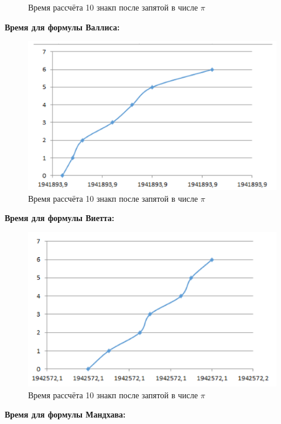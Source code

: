 \documentclass[a4paper, 12pt]{article}
\begin{document}
\begin{enumerate}
\begin{figure}[h!]
	              \caption{Время рассчёта 10 знакп после запятой в числе $\pi$}
                    \label{fig:my_label}
	        \end{figure}
                \newpage
                \textbf{Время для формулы Валлиса:}
                \begin{figure}[h!]
    	        \centering
    	        \includegraphics[scale = 0.25]{5-2.png}
    		    \caption{Время рассчёта 10 знакп после запятой в числе $\pi$}
                    \label{fig:my_label}
        		\end{figure}
          \[\]
                \textbf{Время для формулы Виетта:}
                \begin{figure}[h!]
    	        \centering
    	        \includegraphics[scale = 0.25]{5-3.png}
    		    \caption{Время рассчёта 10 знакп после запятой в числе $\pi$}
                    \label{fig:my_label}
        		\end{figure}
                \newpage
                \textbf{Время для формулы Мандхава:}

\end{enumerate}
\end{document}
